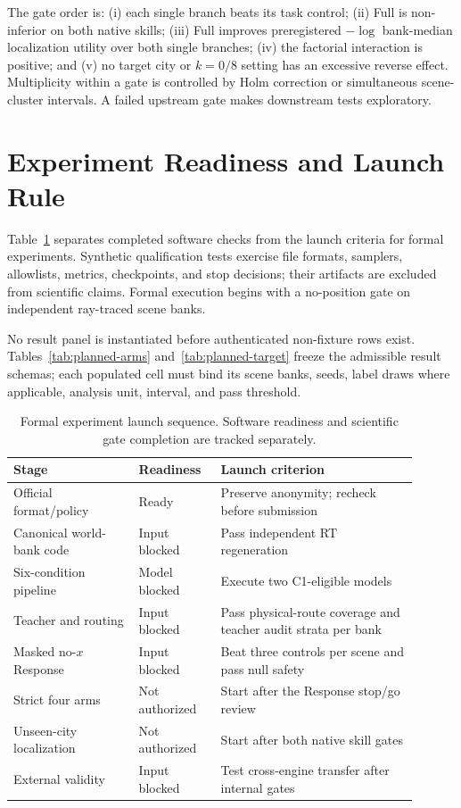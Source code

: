 \documentclass{article}
\begin{document}
The gate order is: (i) each single branch beats its task control; (ii) Full is
non-inferior on both native skills; (iii) Full improves preregistered
$-\log$ bank-median localization utility over both single branches; (iv) the
factorial interaction is positive; and (v) no target city or $k=0/8$ setting
has an excessive reverse effect.  Multiplicity within a gate is controlled by
Holm correction or simultaneous scene-cluster intervals.  A failed upstream
gate makes downstream tests exploratory.

\section{Experiment Readiness and Launch Rule}

Table~\ref{tab:status} separates completed software checks from the launch
criteria for formal experiments.  Synthetic qualification tests exercise file
formats, samplers, allowlists, metrics, checkpoints, and stop decisions; their
artifacts are excluded from scientific claims.  Formal execution begins with a
no-position gate on independent ray-traced scene banks.

No result panel is instantiated before authenticated non-fixture rows exist.
Tables~\ref{tab:planned-arms} and~\ref{tab:planned-target} freeze the admissible
result schemas; each populated cell must bind its scene banks, seeds, label
draws where applicable, analysis unit, interval, and pass threshold.

\begin{table}[t]
\caption{Formal experiment launch sequence. Software readiness and scientific
gate completion are tracked separately.}
\label{tab:status}
\centering
\small
\begin{tabular}{p{0.29\linewidth}p{0.17\linewidth}p{0.44\linewidth}}
\toprule
Stage & Readiness & Launch criterion \\
\midrule
Official format/policy & Ready & Preserve anonymity; recheck before submission \\
Canonical world-bank code & Input blocked & Pass independent RT regeneration \\
Six-condition pipeline & Model blocked & Execute two C1-eligible models \\
Teacher and routing & Input blocked & Pass physical-route coverage and teacher audit strata per bank \\
Masked no-$x$ Response & Input blocked & Beat three controls per scene and pass null safety \\
Strict four arms & Not authorized & Start after the Response stop/go review \\
Unseen-city localization & Not authorized & Start after both native skill gates \\
External validity & Input blocked & Test cross-engine transfer after internal gates \\
\bottomrule
\end{tabular}
\end{table}
\end{document}
